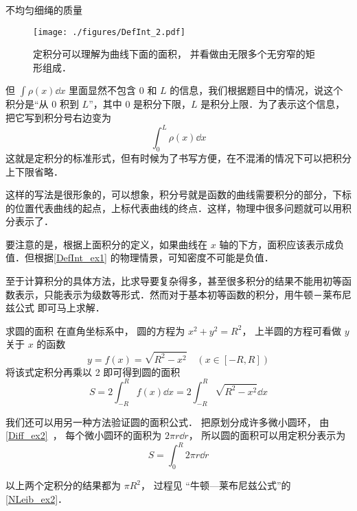 \begin{example}{不均匀细绳的质量}
\begin{figure}[ht]
\centering
\texttt{[image: ./figures/DefInt\_2.pdf]}
\caption{定积分可以理解为曲线下面的面积， 并看做由无限多个无穷窄的矩形组成．} \label{DefInt_fig1} %
\end{figure}

但 $\int \rho(x) \dd{x}$ 里面显然不包含 $0$ 和 $L$ 的信息，我们根据题目中的情况，说这个积分是“从 $0$ 积到 $L$”，其中 $0$ 是积分下限，$L$ 是积分上限．为了表示这个信息，把它写到积分号右边变为
\begin{equation}
\int_0^L \rho(x) \dd{x}
\end{equation}
这就是定积分的标准形式，但有时候为了书写方便，在不混淆的情况下可以把积分上下限省略．
\end{example}

这样的写法是很形象的，可以想象，积分号就是函数的曲线需要积分的部分，下标的位置代表曲线的起点，上标代表曲线的终点．这样，物理中很多问题就可以用积分表示了．

要注意的是，根据上面积分的定义，如果曲线在 $x$ 轴的下方，面积应该表示成负值．但根据\autoref{DefInt_ex1} 的物理情景，可知密度不可能是负值．

至于计算积分的具体方法，比求导要复杂得多，甚至很多积分的结果不能用初等函数表示，只能表示为级数等形式．然而对于基本初等函数的积分，用牛顿－莱布尼兹公式 即可马上求解．

\begin{example}{求圆的面积}\label{DefInt_ex2}
在直角坐标系中， 圆的方程为 $x^2 + y^2 = R^2$， 上半圆的方程可看做 $y$ 关于 $x$ 的函数
\begin{equation}
y = f(x) = \sqrt{R^2 - x^2} \quad (x\in [-R,R])
\end{equation}
将该式定积分再乘以 2 即可得到圆的面积
\begin{equation}
S = 2\int_{-R}^{R} f(x) \dd{x} = 2\int_{-R}^{R} \sqrt{R^2 - x^2} \dd{x}
\end{equation}

我们还可以用另一种方法验证圆的面积公式． 把原划分成许多微小圆环， 由\autoref{Diff_ex2}~， 每个微小圆环的面积为 $2\pi r\dd{r}$， 所以圆的面积可以用定积分表示为
\begin{equation}
S = \int_0^{R} 2\pi r\dd{r}
\end{equation}

以上两个定积分的结果都为 $\pi R^2$， 过程见 “牛顿—莱布尼兹公式”的\autoref{NLeib_ex2}．
\end{example}

